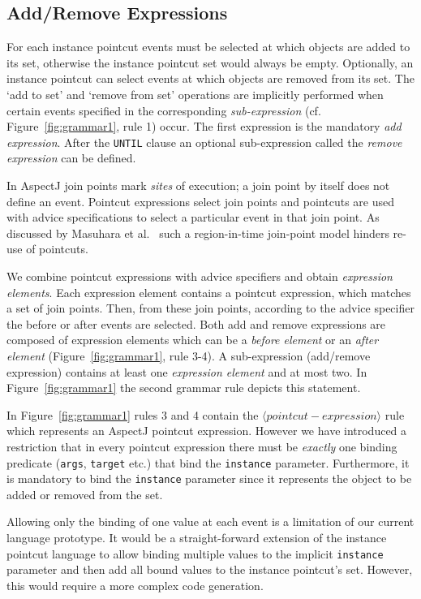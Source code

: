 \documentclass[10pt]{sigplanconf}
\newcommand{\lstinln}[1]{\lstinline~#1~}
\begin{document}
\subsection{Add/Remove Expressions}
\label{sect:addrem}
For each instance pointcut events must be selected at which objects are added to its set, otherwise the instance pointcut set would always be empty.
Optionally, an instance pointcut can select events at which objects are removed from its set.
The `add to set' and `remove from set' operations are implicitly performed when certain events specified in the corresponding \emph{sub-expression} (cf. Figure~\ref{fig:grammar1}, rule 1) occur.
The first expression is the mandatory \emph{add expression}.
After the \lstinln{UNTIL} clause an optional sub-expression called the \emph{remove expression} can be defined.

In AspectJ join points mark \emph{sites} of execution; a join point by itself does not define an event.
Pointcut expressions select join points and pointcuts are used with advice specifications to select a particular event in that join point.
As discussed by Masuhara et al.~\cite{masuharafine} such a region-in-time join-point model hinders re-use of pointcuts.

We combine pointcut expressions with advice specifiers and obtain \emph{expression elements}.
Each expression element contains a pointcut expression, which matches a set of join points.
Then, from these join points, according to the advice specifier the before or after events are selected.
Both add and remove expressions are composed of expression elements which can be a \emph{before element} or an \emph{after element} (Figure~\ref{fig:grammar1}, rule 3-4).
A sub-expression (add/remove expression) contains at least one \emph{expression element} and at most two. In Figure~\ref{fig:grammar1} the second grammar rule depicts this statement.

In Figure~\ref{fig:grammar1} rules 3 and 4 contain the $\langle pointcut-expression\rangle$ rule which represents an AspectJ pointcut expression.
However we have introduced a restriction that in every pointcut expression there must be \emph{exactly} one binding predicate (\lstinln{args}, \lstinln{target} etc.) that bind the \lstinln{instance} parameter.
Furthermore, it is mandatory to bind the \lstinln{instance} parameter since it represents the object to be added or removed from the set.

Allowing only the binding of one value at each event is a limitation of our current language prototype.
It would be a straight-forward extension of the instance pointcut language to allow binding multiple values to the implicit \lstinln{instance} parameter and then add all bound values to the instance pointcut's set.
However, this would require a more complex code generation.
\end{document}
